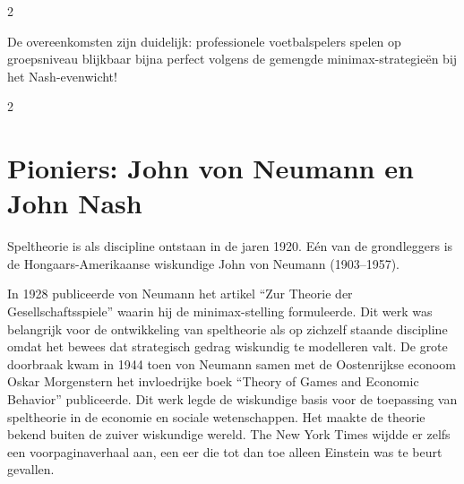 \begin{multicols}{2}

De overeenkomsten zijn duidelijk: professionele voetbalspelers spelen op groepsniveau blijkbaar bijna perfect volgens de gemengde minimax-strategieën bij het Nash-evenwicht!
\end{multicols}

\clearpage
\begin{multicols}{2}
\section{Pioniers: John von Neumann en John Nash}\label{sec:pioniers}

Speltheorie is als discipline ontstaan in de jaren 1920. Eén van de grondleggers is de Hongaars-Amerikaanse wiskundige John von Neumann (1903–1957).


In 1928 publiceerde von Neumann het artikel ``Zur Theorie der Gesellschaftsspiele'' waarin hij de minimax-stelling formuleerde. Dit werk was belangrijk voor de ontwikkeling van speltheorie als op zichzelf staande discipline omdat het bewees dat strategisch gedrag wiskundig te modelleren valt. De grote doorbraak kwam in 1944 toen von Neumann samen met de Oostenrijkse econoom Oskar Morgenstern het invloedrijke boek ``Theory of Games and Economic Behavior'' publiceerde. Dit werk legde de wiskundige basis voor de toepassing van speltheorie in de economie en sociale wetenschappen. Het maakte de theorie bekend buiten de zuiver wiskundige wereld. The New York Times wijdde er zelfs een voorpaginaverhaal aan, een eer die tot dan toe alleen Einstein was te beurt gevallen.


\end{multicols}
